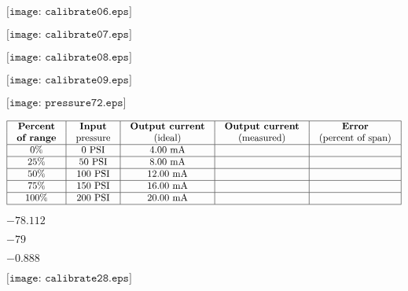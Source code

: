 \documentclass[12pt,a4paper,margin=2cm]{book}
\def\lthtmlcheckvsize{\ifdim\ht\sizebox<\vsize 
  \ifdim\wd\sizebox<\hsize\expandafter\hfill\fi \expandafter\vfill
  \else\expandafter\vss\fi}%
\begin{document}
{\newpage\clearpage
{}%
$\displaystyle \texttt{[image: calibrate06.eps]}$%
\lthtmlindisplaymathZ
\lthtmlcheckvsize\clearpage}

{\newpage\clearpage
{}%
$\displaystyle \texttt{[image: calibrate07.eps]}$%
\lthtmlindisplaymathZ
\lthtmlcheckvsize\clearpage}

{\newpage\clearpage
{}%
$\displaystyle \texttt{[image: calibrate08.eps]}$%
\lthtmlindisplaymathZ
\lthtmlcheckvsize\clearpage}

{\newpage\clearpage
{}%
$\displaystyle \texttt{[image: calibrate09.eps]}$%
\lthtmlindisplaymathZ
\lthtmlcheckvsize\clearpage}

{\newpage\clearpage
{}%
$\displaystyle \texttt{[image: pressure72.eps]}$%
\lthtmlindisplaymathZ
\lthtmlcheckvsize\clearpage}

{\newpage\clearpage
{}%
$\displaystyle \vbox{\offinterlineskip
\halign{\strut
\vrule \quad\hfil # \  \hfil & 
\vrule \quad\hfil # \  \hfil & 
\vrule \quad\hfil # \  \hfil & 
\vrule \quad\hfil # \  \hfil & 
\vrule \quad\hfil # \  \hfil \vrule \cr
\noalign{\hrule }
\textbf{Percent} & \textbf{Input} & \textbf{Output current} & \textbf{Output current} & \textbf{Error} \cr
\textbf{of range} & pressure & (ideal) & (measured) & (percent of span) \cr
\noalign{\hrule }
0\% & 0 PSI & 4.00 mA &  & \cr
\noalign{\hrule }
25\% & 50 PSI & 8.00 mA &  & \cr
\noalign{\hrule }
50\% & 100 PSI & 12.00 mA &  & \cr
\noalign{\hrule }
75\% & 150 PSI & 16.00 mA &  & \cr
\noalign{\hrule }
100\% & 200 PSI & 20.00 mA &  & \cr
\noalign{\hrule }
} %
}$%
\lthtmlindisplaymathZ
\lthtmlcheckvsize\clearpage}

{\newpage\clearpage
{}%
$ -78.112$%
\lthtmlindisplaymathZ
\lthtmlcheckvsize\clearpage}

{\newpage\clearpage
{}%
$ -79$%
\lthtmlindisplaymathZ
\lthtmlcheckvsize\clearpage}

{\newpage\clearpage
{}%
$ -0.888$%
\lthtmlindisplaymathZ
\lthtmlcheckvsize\clearpage}

{\newpage\clearpage
{}%
$\displaystyle \texttt{[image: calibrate28.eps]}$%
\lthtmlindisplaymathZ
\lthtmlcheckvsize\clearpage}
\end{document}
